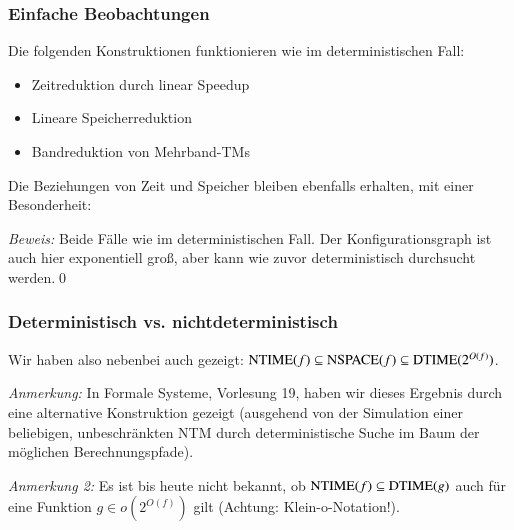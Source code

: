 \documentclass[onlymath]{beamer}
\begin{document}
\begin{frame}\frametitle{Einfache Beobachtungen}


Die folgenden Konstruktionen funktionieren wie im deterministischen Fall:
\begin{itemize}
\item Zeitreduktion durch linear Speedup
\item Lineare Speicherreduktion
\item Bandreduktion von Mehrband-TMs
\end{itemize}\pause

Die Beziehungen von Zeit und Speicher bleiben ebenfalls erhalten, mit einer Besonderheit:
\medskip


\pause\emph{Beweis:} Beide Fälle wie im deterministischen Fall.
Der Konfigurationsgraph ist auch hier
exponentiell groß, aber kann wie zuvor deterministisch durchsucht werden.\qed

\end{frame}

\begin{frame}\frametitle{Deterministisch vs. nichtdeterministisch}

Wir haben also nebenbei auch gezeigt: ${\textsc{NTIME}}(f) \subseteq {\textsc{NSPACE}}(f)\subseteq {\textsc{DTIME}}(2^{O(f)})$.\bigskip


\emph{Anmerkung:} In Formale Systeme, Vorlesung 19, haben wir dieses Ergebnis durch eine alternative Konstruktion gezeigt (ausgehend von der Simulation einer beliebigen, unbeschränkten NTM durch deterministische Suche im Baum der möglichen Berechnungspfade).
\bigskip

\emph{Anmerkung 2:} Es ist bis heute nicht bekannt, ob ${\textsc{NTIME}}(f) \subseteq {\textsc{DTIME}}(g)$ auch für eine Funktion $g\in o(2^{O(f)})$ gilt
(Achtung: Klein-o-Notation!).
%

\end{frame}
\end{document}
